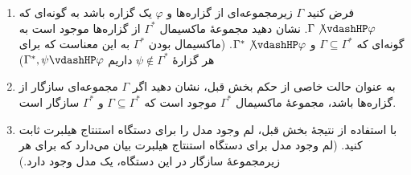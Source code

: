 \begin{enumerate}[label=(\alph*)]
    \item فرض کنید $\Gamma$ زیرمجموعه‌ای از گزاره‌ها و $\varphi$ یک گزاره باشد به گونه‌ای که $\Gamma \not\vdashHP \varphi$. نشان دهید مجموعهٔ ماکسیمال $\Gamma^*$ از گزاره‌ها موجود است به گونه‌ای که $\Gamma \subseteq \Gamma^*$ و $\Gamma^* \not\vdashHP \varphi$. (ماکسیمال بودن $\Gamma^*$ به این معناست که برای هر گزارهٔ $\psi \not\in \Gamma^*$ داریم $\Gamma^*,\psi \vdashHP \varphi$)
    \item به عنوان حالت خاصی از حکم بخش قبل، نشان دهید اگر $\Gamma$ مجموعه‌ای سازگار از گزاره‌ها باشد، مجموعهٔ ماکسیمال $\Gamma^*$ موجود است که $\Gamma \subseteq \Gamma^*$ و $\Gamma^*$ سازگار است.
    \item با استفاده از نتیجهٔ بخش قبل، لم وجود مدل را برای دستگاه استنتاج هیلبرت ثابت کنید. (لم وجود مدل برای دستگاه استنتاج هیلبرت بیان می‌دارد که برای هر زیرمجموعهٔ سازگار در این دستگاه، یک مدل وجود دارد.)
\end{enumerate}
\quad\vspace{-0.5cm}
